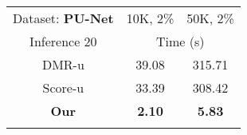 \begin{tabular}{ccc}
    \toprule
    Dataset: \bf PU-Net & \multicolumn{1}{c}{10K, 2\%} & \multicolumn{1}{c}{50K, 2\%}  \\
    Inference 20 &\multicolumn{2}{c}{Time (s)}   \\
    \midrule
    DMR-u\cite{luo2020DMR}     & 39.08 & 315.71   \\
    Score-u\cite{luo_score-based_2021}   & 33.39 & 308.42   \\
    \midrule
    \bf Our & \bf 2.10 & \bf 5.83  \\
\bottomrule
\label{tab:time}
\end{tabular}

